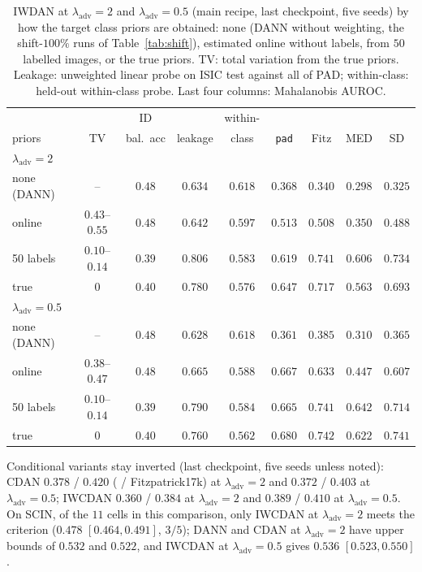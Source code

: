 \documentclass{midl}
\newcommand{\lam}{\lambda_{\mathrm{adv}}}
\begin{document}
\begin{table}[h]
\centering
\caption{IWDAN at $\lam=2$ and $\lam=0.5$ (main recipe, last checkpoint, five seeds) by how the target class
priors are obtained: none (DANN without weighting, the shift-$100\%$ runs of Table~\ref{tab:shift}), estimated online
without labels, from $50$ labelled images, or the true priors. TV: total variation from the true \texttt{} priors. Leakage:
unweighted linear probe on ISIC test against all of PAD; within-class: held-out within-class probe. Last four columns: Mahalanobis AUROC.}
\label{tab:prior}
\begin{tabular}{lcccccccc}
\toprule
 & & ID & & within- & & & & \\
priors & TV & bal.\ acc & leakage & class & \texttt{pad} & Fitz & MED & SD \\
\midrule
\multicolumn{9}{l}{$\lam=2$} \\
none (DANN) & -- & $0.48$ & $0.634$ & $0.618$ & $0.368$ & $0.340$ & $0.298$ & $0.325$ \\
online & $0.43$--$0.55$ & $0.48$ & $0.642$ & $0.597$ & $0.513$ & $0.508$ & $0.350$ & $0.488$ \\
50 labels & $0.10$--$0.14$ & $0.39$ & $0.806$ & $0.583$ & $0.619$ & $0.741$ & $0.606$ & $0.734$ \\
true & $0$ & $0.40$ & $0.780$ & $0.576$ & $0.647$ & $0.717$ & $0.563$ & $0.693$ \\
\midrule
\multicolumn{9}{l}{$\lam=0.5$} \\
none (DANN) & -- & $0.48$ & $0.628$ & $0.618$ & $0.361$ & $0.385$ & $0.310$ & $0.365$ \\
online & $0.38$--$0.47$ & $0.48$ & $0.665$ & $0.588$ & $0.667$ & $0.633$ & $0.447$ & $0.607$ \\
50 labels & $0.10$--$0.14$ & $0.39$ & $0.790$ & $0.584$ & $0.665$ & $0.741$ & $0.642$ & $0.714$ \\
true & $0$ & $0.40$ & $0.760$ & $0.562$ & $0.680$ & $0.742$ & $0.622$ & $0.741$ \\
\bottomrule
\end{tabular}
\end{table}

Conditional variants stay inverted
(last checkpoint, five seeds unless noted): CDAN $0.378$ / $0.420$ (\texttt{} /
Fitzpatrick17k) at $\lam=2$ and $0.372$ / $0.403$ at $\lam=0.5$; IWCDAN $0.360$ /
$0.384$ at $\lam=2$ and $0.389$ / $0.410$ at $\lam=0.5$. On SCIN, of the $11$ cells in this comparison, only IWCDAN at $\lam=2$ meets the criterion ($0.478$ $[0.464, 0.491]$, $3/5$); DANN and CDAN at $\lam=2$ have upper bounds of $0.532$ and $0.522$, and IWCDAN at $\lam=0.5$ gives $0.536$ $[0.523, 0.550]$.
\end{document}
